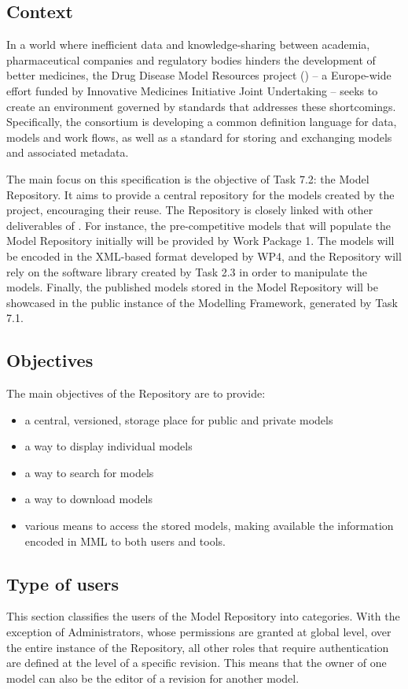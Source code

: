 \subsection{Context}
\label{context}
In a world where inefficient data and knowledge-sharing between academia, pharmaceutical companies and regulatory bodies hinders the development of better medicines, the Drug Disease Model Resources project (\ddmore) -- a Europe-wide effort funded by Innovative Medicines Initiative Joint Undertaking -- seeks to create an environment governed by standards that addresses these shortcomings. Specifically, the \ddmore consortium is developing a common definition language for data, models and work flows, as well as a standard for storing and exchanging \glspl{model} and associated \gls{metadata}\cite{ddmore:dow}.

The main focus on this specification is the objective of Task 7.2: the \ddmore Model Repository. It aims to provide a central repository for the models created by the project, encouraging their reuse. The Repository is closely linked with other deliverables of \ddmore. For instance, the pre-competitive models that will populate the Model Repository initially will be provided by Work Package 1. The models will be encoded in the XML-based format developed by WP4, and the Repository will rely on the software library created by Task 2.3 in order to manipulate the models. Finally, the published models stored in the \ddmore Model Repository will be showcased in the public instance of the Modelling Framework, generated by Task 7.1.

\subsection{Objectives}
\label{objectives}
The main objectives of the Repository are to provide:
\begin{itemize}
  \item a central, versioned, storage place for public and private models
  \item a way to display individual models
  \item a way to search for models
  \item a way to download models
  \item various means to access the stored \glspl{model}, making available the information encoded in MML to both users and tools. 
\end{itemize}

\subsection{Type of users}
\label{users}
This section classifies the users of the \ddmore Model Repository into categories. With the exception of Administrators, whose permissions are granted at global level, over the entire instance of the Repository, all other roles that require authentication are defined at the level of a specific revision. This means that the owner of one model can also be the editor of a revision for another model. 

